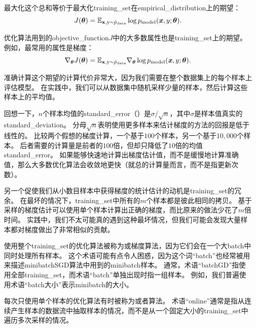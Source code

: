 最大化这个总和等价于最大化\gls{training_set}在\gls{empirical_distribution}上的期望：
\begin{equation}
\label{eq:8.5}
    J(\boldsymbol{\theta}) = \mathbb{E}_{\mathbf{x}, \mathrm{y} \sim\hat{p}_\text{data}} 
    \log p_{\text{model}} (\boldsymbol{\mathit{x}},y ; \boldsymbol{\theta}) .
\end{equation}


优化算法用到的\gls{objective_function}$J$中的大多数属性也是\gls{training_set}上的期望。
例如，最常用的属性是梯度：
\begin{equation}
\label{eq:8.6}
    \nabla_{\boldsymbol{\theta}} J(\boldsymbol{\theta}) = \mathbb{E}_{\mathbf{x}, \mathrm{y} \sim\hat{p}_{\text{data}}} 
    \nabla_{\boldsymbol{\theta}} \log p_{\text{model}} (\boldsymbol{\mathit{x}},y; \boldsymbol{\theta}) .
\end{equation}


准确计算这个期望的计算代价非常大，因为我们需要在整个数据集上的每个样本上评估模型。
在实践中，我们可以从数据集中随机采样少量的样本，然后计算这些样本上的平均值。


回想一下，$n$个样本均值的\gls{standard_error}（）是$\sigma/\sqrt{n}$，其中$\sigma$是样本值真实的\gls{standard_deviation}。
分母$\sqrt{n}$表明使用更多样本来估计梯度的方法的回报是低于线性的。
比较两个假想的梯度计算，一个基于$100$个样本，另一个基于$10,000$个样本。
后者需要的计算量是前者的$100$倍，但却只降低了$10$倍的均值\gls{standard_error}。
如果能够快速地计算出梯度估计值，而不是缓慢地计算准确值，那么大多数优化算法会收敛地更快（就总的计算量而言，而不是指更新次数）。


另一个促使我们从小数目样本中获得梯度的统计估计的动机是\gls{training_set}的冗余。
在最坏的情况下，\gls{training_set}中所有的$m$个样本都是彼此相同的拷贝。
基于采样的梯度估计可以使用单个样本计算出正确的梯度，而比原来的做法少花了$m$倍时间。
实践中，我们不太可能真的遇到这种最坏情况，但我们可能会发现大量样本都对梯度做出了非常相似的贡献。

使用整个\gls{training_set}的优化算法被称为或梯度算法，因为它们会在一个大\gls{batch}中同时处理所有样本。
这个术语可能有点令人困惑，因为这个词``\gls{batch}''也经常被用来描述\gls{minibatch}\gls{SGD}算法中用到的\gls{minibatch}样本。
通常，术语``\gls{batch}\gls{GD}''指使用全部\gls{training_set}，而术语``\gls{batch}''单独出现时指一组样本。
例如，我们普遍使用术语``\gls{batch}大小''表示\gls{minibatch}的大小。


每次只使用单个样本的优化算法有时被称为或者算法。
术语``\gls{online}''通常是指从连续产生样本的数据流中抽取样本的情况，而不是从一个固定大小的\gls{training_set}中遍历多次采样的情况。


